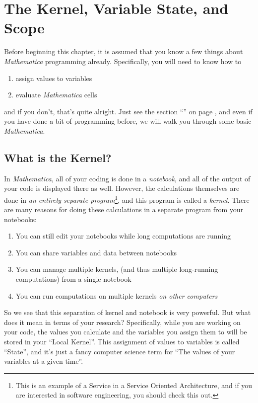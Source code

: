 \chapter[Kernel, State, Scope]{The Kernel, Variable State, and Scope}
\label{chap:Kernel}

Before beginning this chapter, it is assumed that you know a few things about \emph{Mathematica} programming already. Specifically, you will need to know how to
\begin{enumerate}
	   \item assign values to variables
	   \item evaluate \emph{Mathematica} cells
\end{enumerate}
and if you don't, that's quite alright. Just see the section ``\emph{}'' on page \pageref{chap:Prelim}, and even if you have done a bit of programming before, we will walk you through some basic \emph{Mathematica}.

\section{What is the Kernel?}

In \emph{Mathematica}, all of your coding is done in a \emph{notebook}, and all of the output of your code is displayed there as well. However, the calculations themselves are done in \emph{an entirely separate program}\footnote{This is an example of a Service in a Service Oriented Architecture, and if you are interested in software engineering, you should check this out.}, and this program is called a \emph{kernel}. There are many reasons for doing these calculations in a separate program from your notebooks:

\begin{enumerate}
	   \item You can still edit your notebooks while long computations are running
	   \item You can share variables and data between notebooks
	   \item You can manage multiple kernels, (and thus multiple long-running computations) from a single notebook
	   \item You can run computations on multiple kernels \emph{on other computers}
\end{enumerate}

So we see that this separation of kernel and notebook is very powerful. But what does it mean in terms of your research? Specifically, while you are working on your code, the values you calculate and the variables you assign them to will be stored in your ``Local Kernel''. This assignment of values to variables is called ``State'', and it's just a fancy computer science term for ``The values of your variables at a given time''.

